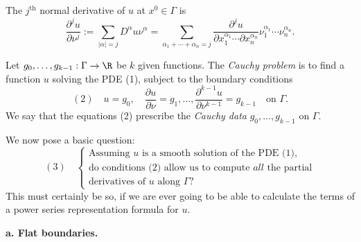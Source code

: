 \begin{definition}
\label{def:normal-derivative-notation}
The $j^{\text{th}}$ normal derivative of $u$ at $x^0 \in \Gamma$ is
$$\frac{\partial^j u}{\partial \nu^j} := \sum_{|\alpha|=j} D^\alpha u \nu^\alpha = \sum_{\alpha_1 + \cdots + \alpha_n = j} \frac{\partial^j u}{\partial x_1^{\alpha_1} \cdots \partial x_n^{\alpha_n}} \nu_1^{\alpha_1} \cdots \nu_n^{\alpha_n}.$$
\end{definition}

\begin{definition}
\label{def:cauchy-problem-cauchy-data}
Let $g_0, \ldots, g_{k-1}: \Gamma \to \R$ be $k$ given functions. The \textit{Cauchy problem} is to find a function $u$ solving the PDE (1), subject to the boundary conditions
$$(2) \quad u = g_0, \quad \frac{\partial u}{\partial \nu} = g_1, \ldots, \frac{\partial^{k-1} u}{\partial \nu^{k-1}} = g_{k-1} \quad \text{on } \Gamma.$$
We say that the equations (2) prescribe the \textit{Cauchy data} $g_0, \ldots, g_{k-1}$ on $\Gamma$.
\end{definition}

We now pose a basic question:
$$(3) \quad \begin{cases} \text{Assuming } u \text{ is a smooth solution of the PDE (1),} \\ \text{do conditions (2) allow us to compute } \textit{all} \text{ the partial} \\ \text{derivatives of } u \text{ along } \Gamma? \end{cases}$$
This must certainly be so, if we are ever going to be able to calculate the terms of a power series representation formula for $u$.

\textbf{a. Flat boundaries.}

